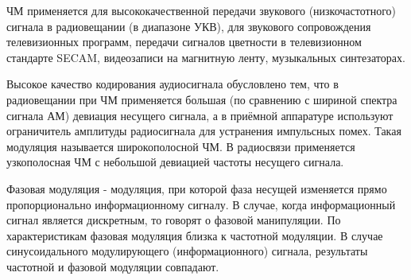 \documentclass[a4paper,12pt]{article}
\begin{document}
ЧМ применяется для высококачественной передачи звукового (низкочастотного) сигнала в радиовещании (в диапазоне УКВ), для звукового сопровождения телевизионных программ, передачи сигналов цветности в телевизионном стандарте SECAM, видеозаписи на магнитную ленту, музыкальных синтезаторах.

Высокое качество кодирования аудиосигнала обусловлено тем, что в радиовещании при ЧМ применяется большая (по сравнению с шириной спектра сигнала АМ) девиация несущего сигнала, а в приёмной аппаратуре используют ограничитель амплитуды радиосигнала для устранения импульсных помех. Такая модуляция называется широкополосной ЧМ. В радиосвязи применяется узкополосная ЧМ с небольшой девиацией частоты несущего сигнала.

Фазовая модуляция - модуляция, при которой фаза несущей изменяется прямо пропорционально информационному сигналу. В случае, когда информационный сигнал является дискретным, то говорят о фазовой манипуляции. По характеристикам фазовая модуляция близка к частотной модуляции. В случае синусоидального модулирующего (информационного) сигнала, результаты частотной и фазовой модуляции совпадают.
\newpage
\end{document}
